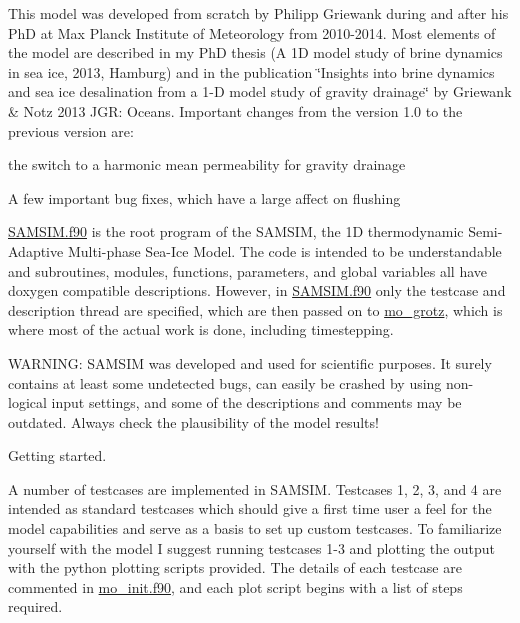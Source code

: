 This model was developed from scratch by Philipp Griewank during and after his PhD at Max Planck Institute of Meteorology from 2010-\/2014. Most elements of the model are described in my PhD thesis (A 1D model study of brine dynamics in sea ice, 2013, Hamburg) and in the publication \char`\"{}Insights into brine dynamics and sea ice desalination from a 1-\/D model study of gravity drainage\char`\"{} by Griewank \& Notz 2013 JGR: Oceans. Important changes from the version 1.0 to the previous version are:
\begin{DoxyItemize}
\item the switch to a harmonic mean permeability for gravity drainage
\item A few important bug fixes, which have a large affect on flushing
\end{DoxyItemize}

\hyperlink{SAMSIM_8f90}{SAMSIM.f90} is the root program of the SAMSIM, the 1D thermodynamic Semi-\/Adaptive Multi-\/phase Sea-\/Ice Model. The code is intended to be understandable and subroutines, modules, functions, parameters, and global variables all have doxygen compatible descriptions. However, in \hyperlink{SAMSIM_8f90}{SAMSIM.f90} only the testcase and description thread are specified, which are then passed on to \hyperlink{namespacemo__grotz}{mo\_\-grotz}, which is where most of the actual work is done, including timestepping.

WARNING: SAMSIM was developed and used for scientific purposes. It surely contains at least some undetected bugs, can easily be crashed by using non-\/logical input settings, and some of the descriptions and comments may be outdated. Always check the plausibility of the model results!

Getting started.
\begin{DoxyItemize}
\item A number of testcases are implemented in SAMSIM. Testcases 1, 2, 3, and 4 are intended as standard testcases which should give a first time user a feel for the model capabilities and serve as a basis to set up custom testcases. To familiarize yourself with the model I suggest running testcases 1-\/3 and plotting the output with the python plotting scripts provided. The details of each testcase are commented in \hyperlink{mo__init_8f90}{mo\_\-init.f90}, and each plot script begins with a list of steps required.
\end{DoxyItemize}

